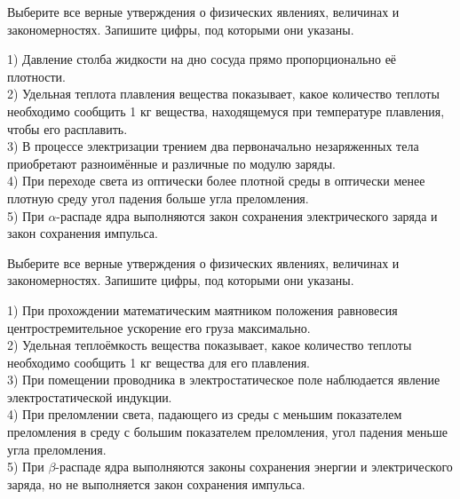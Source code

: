 \begin{taskbasic}[code={\label{task:kim18_img16}}]
Выберите все верные утверждения о физических явлениях, величинах и закономерностях. Запишите цифры, под которыми они указаны.

1) Давление столба жидкости на дно сосуда прямо пропорционально её плотности.\\
2) Удельная теплота плавления вещества показывает, какое количество теплоты необходимо сообщить 1 кг вещества, находящемуся при температуре плавления, чтобы его расплавить.\\
3) В процессе электризации трением два первоначально незаряженных тела приобретают разноимённые и различные по модулю заряды.\\
4) При переходе света из оптически более плотной среды в оптически менее плотную среду угол падения больше угла преломления.\\
5) При $\alpha$-распаде ядра выполняются закон сохранения электрического заряда и закон сохранения импульса.

\end{taskbasic}

\begin{taskbasic}[code={\label{task:kim18_img17}}]
Выберите все верные утверждения о физических явлениях, величинах и закономерностях. Запишите цифры, под которыми они указаны.

1) При прохождении математическим маятником положения равновесия центростремительное ускорение его груза максимально.\\
2) Удельная теплоёмкость вещества показывает, какое количество теплоты необходимо сообщить 1 кг вещества для его плавления.\\
3) При помещении проводника в электростатическое поле наблюдается явление электростатической индукции.\\
4) При преломлении света, падающего из среды с меньшим показателем преломления в среду с большим показателем преломления, угол падения меньше угла преломления.\\
5) При $\beta$-распаде ядра выполняются законы сохранения энергии и электрического заряда, но не выполняется закон сохранения импульса.

\end{taskbasic}

